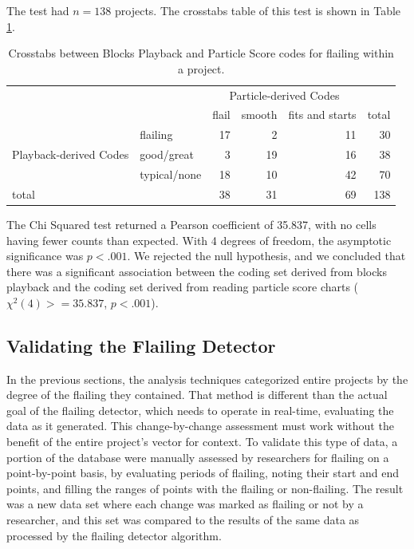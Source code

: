 The test had $n=138$ projects. The crosstabs table of this test is shown in Table \ref{tab:crosstab-blocks-particle}.
\begin{table}
\begin{centering}
	\begin{tabular}{l l r r r | r}
			&& \multicolumn{3}{c}{Particle-derived Codes} 	\\
			&	& flail 	& smooth 	& fits and starts 	& total	\\ \hline
	\multirow{3}{*}{Playback-derived Codes}
	& flailing 		& 17	& 2			& 11		& 30	\\
	& good/great	& 3		& 19		& 16		& 38	\\
	& typical/none	& 18	& 10		& 42		& 70	\\ \hline
	total	&  		& 38	& 31		& 69		& 138
	\end{tabular}
	\caption[Flailing crosstabs between Blocks Playback and Particle Scores]{Crosstabs between Blocks Playback and Particle Score codes for flailing within a project.}
	\label{tab:crosstab-blocks-particle}
\end{centering}
\end{table}

The Chi Squared test returned a Pearson coefficient of 35.837, with no cells having fewer counts than expected. With 4 degrees of freedom, the asymptotic significance was $p<.001$. We rejected the null hypothesis, and we concluded that there was a significant association between the coding set derived from blocks playback and the coding set derived from reading particle score charts ($\chi^2(4)> = 35.837$, $p < .001$). 


\subsection{Validating the Flailing Detector}
\label{sec:validation-flailing-detector}
In the previous sections, the analysis techniques categorized entire projects by the degree of the flailing they contained. That method is different than the actual goal of the flailing detector, which needs to operate in real-time, evaluating the data as it generated. This change-by-change assessment must work without the benefit of the entire project's vector for context. To validate this type of data, a portion of the database were manually assessed by researchers for flailing on a point-by-point basis, by evaluating periods of flailing, noting their start and end points, and filling the ranges of points with the flailing or non-flailing. The result was a new data set where each change was marked as flailing or not by a researcher, and this set was compared to the results of the same data as processed by the flailing detector algorithm. 


